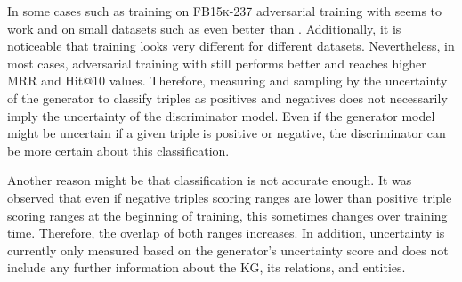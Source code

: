 

In some cases such as training on \textsc{FB15k-237} adversarial training with \ussoftmax seems to work and on small datasets such as \umls even better than \origsampling.
Additionally, it is noticeable that training looks very different for different datasets.
Nevertheless, in most cases, adversarial training with \origsampling still performs better and reaches higher MRR and Hit@10 values.
Therefore, measuring and sampling by the uncertainty of the generator to classify triples as positives and negatives does not necessarily imply the uncertainty of the discriminator model.
Even if the generator model might be uncertain if a given triple is positive or negative, the discriminator can be more certain about this classification.
\clearpage



Another reason might be that classification is not accurate enough.
It was observed that even if negative triples scoring ranges are lower than positive triple scoring ranges at the beginning of training, this sometimes changes over training time.
Therefore, the overlap of both ranges increases.
In addition, uncertainty is currently only measured based on the generator's uncertainty score and does not include any further information about the \ac{KG}, its relations, and entities.
\clearpage




